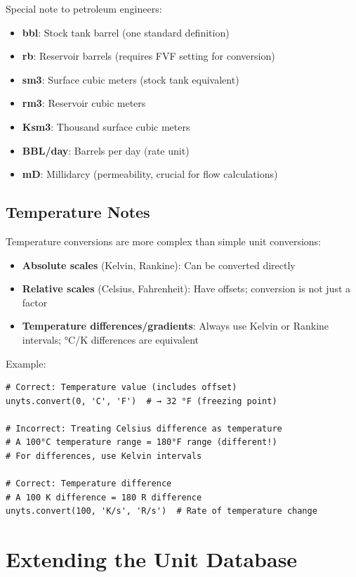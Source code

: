 \documentclass[11pt,a4paper]{report}
\begin{document}
Special note to petroleum engineers:
\begin{itemize}
\item \textbf{bbl}: Stock tank barrel (one standard definition)
\item \textbf{rb}: Reservoir barrels (requires FVF setting for conversion)
\item \textbf{sm3}: Surface cubic meters (stock tank equivalent)
\item \textbf{rm3}: Reservoir cubic meters
\item \textbf{Ksm3}: Thousand surface cubic meters
\item \textbf{BBL/day}: Barrels per day (rate unit)
\item \textbf{mD}: Millidarcy (permeability, crucial for flow calculations)
\end{itemize}

\subsection{Temperature Notes}

Temperature conversions are more complex than simple unit conversions:
\begin{itemize}
\item \textbf{Absolute scales} (Kelvin, Rankine): Can be converted directly
\item \textbf{Relative scales} (Celsius, Fahrenheit): Have offsets; conversion is not just a factor
\item \textbf{Temperature differences/gradients}: Always use Kelvin or Rankine intervals; °C/K differences are equivalent
\end{itemize}

Example:
\begin{lstlisting}[style=pythonstyle]
# Correct: Temperature value (includes offset)
unyts.convert(0, 'C', 'F')  # → 32 °F (freezing point)

# Incorrect: Treating Celsius difference as temperature
# A 100°C temperature range = 180°F range (different!)
# For differences, use Kelvin intervals

# Correct: Temperature difference
# A 100 K difference = 180 R difference
unyts.convert(100, 'K/s', 'R/s')  # Rate of temperature change
\end{lstlisting}

\section{Extending the Unit Database}
\end{document}
